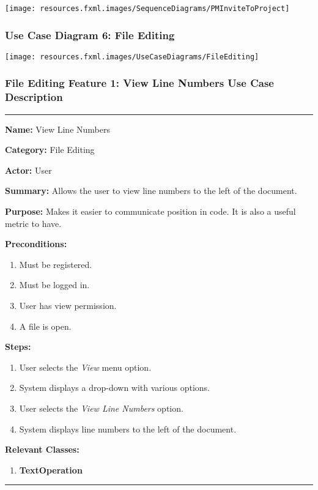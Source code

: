 \documentclass[twoside,letterpaper]{article}
\begin{document}
\texttt{[image: resources.fxml.images/SequenceDiagrams/PMInviteToProject]}
\newpage

\subsubsection[Use Case Diagram 6: File Editing]{\rmfamily\bfseries\color{black}
	Use Case Diagram 6: File Editing}

\texttt{[image: resources.fxml.images/UseCaseDiagrams/FileEditing]}

\newpage

\subsubsection[File Editing Feature 1: View Line Numbers]{\rmfamily\bfseries\color{black}
	File Editing Feature 1: View Line Numbers Use Case Description}
\hypertarget{RefHeading22059017292}{}

\vspace{2pt}
\hrule
\vspace{8pt}
	\noindent\textbf{Name:} View Line Numbers \newline
	
	\noindent\textbf{Category:} File Editing \newline
	
	\noindent\textbf{Actor:} User \newline
	
	\noindent\textbf{Summary:} Allows the user to view line numbers to the left of the document. \newline
	
	\noindent\textbf{Purpose:} Makes it easier to communicate position in code. It is also a useful metric to have.\newline
	
	\noindent\textbf{Preconditions:}
	\begin{enumerate}
		\item Must be registered.
		\item Must be logged in.
		\item User has view permission.
		\item A file is open.
	\end{enumerate}
	\noindent\textbf{Steps:}
	\begin{enumerate}
		\item User selects the \textit{View} menu option.
		\item System displays a drop-down with various options.
		\item User selects the \textit{View Line Numbers} option.
		\item System displays line numbers to the left of the document.
	\end{enumerate}
	\noindent\textbf{Relevant Classes:}
	\begin{enumerate}
		\item \textbf {TextOperation}

	\end{enumerate}
\vspace{8pt}
\hrule
\newpage
\end{document}
